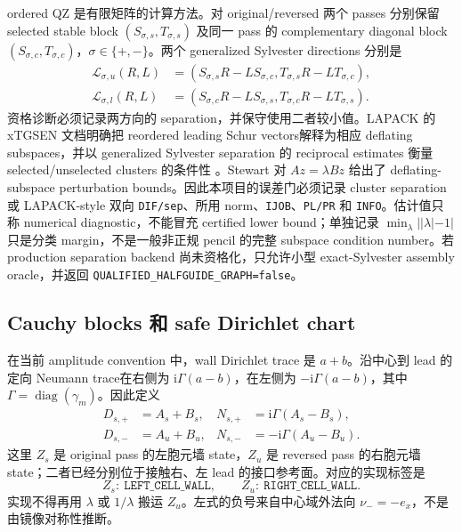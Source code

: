 \documentclass[UTF8,fontset=fandol,11pt,a4paper]{ctexart}
\newcommand{\ii}{\mathrm{i}}
\begin{document}
ordered QZ 是有限矩阵的计算方法。对 original/reversed 两个 passes 分别保留 selected
stable block $(S_{\sigma,s},T_{\sigma,s})$ 及同一 pass 的 complementary diagonal block
$(S_{\sigma,c},T_{\sigma,c})$，$\sigma\in\{+,-\}$。两个 generalized Sylvester directions
分别是
\[
\begin{aligned}
  \mathcal L_{\sigma,u}(R,L)
  &=(S_{\sigma,s}R-LS_{\sigma,c},
     T_{\sigma,s}R-LT_{\sigma,c}),\\
  \mathcal L_{\sigma,l}(R,L)
  &=(S_{\sigma,c}R-LS_{\sigma,s},
     T_{\sigma,c}R-LT_{\sigma,s}).
\end{aligned}
\]
资格诊断必须记录两方向的 separation，并保守使用二者较小值。LAPACK 的 xTGSEN 文档明确把 reordered leading
Schur vectors解释为相应 deflating subspaces，并以 generalized Sylvester separation
的 reciprocal estimates 衡量 selected/unselected clusters 的条件性
\cite{LAPACKTGSEN}。Stewart 对 $Az=\lambda Bz$ 给出了 deflating-subspace perturbation
bounds\cite{Stewart1972}。因此本项目的误差门必须记录 cluster separation 或
LAPACK-style 双向 \texttt{DIF/sep}、所用 norm、\texttt{IJOB}、\texttt{PL/PR} 和
\texttt{INFO}。估计值只称 numerical diagnostic，不能冒充 certified lower bound；单独记录
$\min_\lambda||\lambda|-1|$ 只是分类 margin，不是一般非正规 pencil 的完整
subspace condition number。若 production separation backend 尚未资格化，只允许小型
exact-Sylvester assembly oracle，并返回
\texttt{QUALIFIED\_HALFGUIDE\_GRAPH=false}。

\subsection{Cauchy blocks 和 safe Dirichlet chart}

在当前 amplitude convention 中，wall Dirichlet trace 是 $a+b$。沿中心到 lead 的
定向 Neumann trace在右侧为 $\ii\Gamma(a-b)$，在左侧为
$-\ii\Gamma(a-b)$，其中 $\Gamma=\operatorname{diag}(\gamma_m)$。因此定义
\begin{align}
  D_{s,+}&=A_s+B_s,
  &N_{s,+}&=\ii\Gamma(A_s-B_s),\label{eq:right-cauchy}\\
  D_{s,-}&=A_u+B_u,
  &N_{s,-}&=-\ii\Gamma(A_u-B_u).\label{eq:left-cauchy}
\end{align}
这里 $Z_s$ 是 original pass 的左胞元墙 state，$Z_u$ 是 reversed pass 的右胞元墙
state；二者已经分别位于接触右、左 lead 的接口参考面。对应的实现标签是
\[
  Z_s:\ \texttt{LEFT\_CELL\_WALL},
  \qquad
  Z_u:\ \texttt{RIGHT\_CELL\_WALL}.
\]
实现不得再用 $\lambda$ 或 $1/\lambda$ 搬运 $Z_u$。左式的负号来自中心域外法向
$\nu_-=-e_x$，不是由镜像对称性推断。
\end{document}

